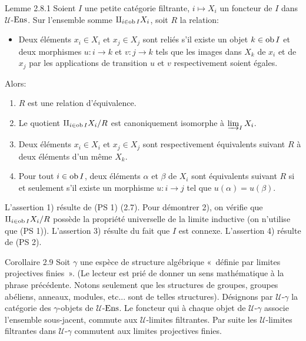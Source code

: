 \documentclass[10pt]{../fichiers-configuration-latex/smfart}
\def\labelenumi{(\theenumi)}
\begin{document}
\begin{enonce*}{Lemme 2.8.1}
Soient $I$ une petite catégorie filtrante, $i\mapsto X_i$ un
foncteur de $I$ dans $𝒰$-$\operatorname{Ens}$. Sur l'ensemble somme
$\amalg_{i\in
 \operatorname{ob} I} X_i$, soit $R$ la relation:
\begin{itemize}
\item[(R)] Deux éléments $x_i\in X_i$ et $x_j\in X_j$ sont
  reliés s'il existe un objet $k\in \operatorname{ob} I$ et deux morphismes
  $u:i\rightarrow k$ et $v:j\rightarrow k$ tels que les images dans
  $X_k$ de $x_i$ et de $x_j$ par les applications de transition $u$ et
  $v$ respectivement soient égales.
\end{itemize}
Alors:\pageoriginale
\begin{enumerate}
\renewcommand{\labelenumi}{\theenumi)}
\item $R$ est une relation d'équivalence.

\item Le quotient $\amalg_{i\in \operatorname{ob} I}X_i/R$ est canoniquement isomorphe
  à $\varinjlim_I X_i$.

\item Deux éléments $x_i\in X_i$ et $x_j\in X_j$ sont
  respectivement équivalents suivant $R$ à deux éléments d'un
  même $X_k$.

\item Pour tout $i\in \operatorname{ob} I$, deux éléments $\alpha$ et $\beta$ de $X_i$ sont
  équivalents suivant $R$ si et seulement s'il existe un morphisme
  $u:i\rightarrow j$ tel que $u(\alpha)=u(\beta)$.
\end{enumerate}
\end{enonce*}

L'assertion 1) résulte de (PS 1) (2.7). Pour démontrer 2), on %
vérifie que $\amalg_{i\in \operatorname{ob} I}X_i/R$ possède la propriété
universelle de la limite inductive (on n'utilise que (PS 1)).
L'assertion 3) résulte du fait que $I$ est connexe. L'assertion 4)
résulte de (PS 2).

\begin{enonce*}{Corollaire 2.9}
Soit $%
\gamma$ une espèce de structure algébrique « définie par limites
projectives finies ». (Le lecteur est prié de donner un sens
mathématique à la phrase précédente. Notons seulement que les
structures de groupes, groupes abéliens, anneaux, modules, etc... %
sont de telles structures). Désignons par $𝒰$-$\gamma$ la
catégorie des $\gamma$-objets de $𝒰$-$\operatorname{Ens}$. Le foncteur qui
à chaque objet de $𝒰$-$\gamma$ associe l'ensemble
sous-jacent, commute aux $𝒰$-limites filtrantes. Par suite
les $𝒰$-limites filtrantes dans $𝒰$-$\gamma$
commutent aux limites projectives finies.
\end{enonce*}
\end{document}
